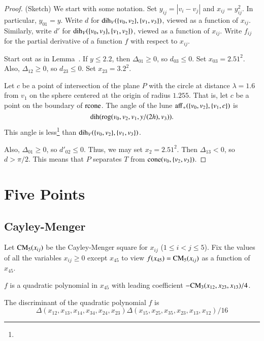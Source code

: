 \begin{proof} (Sketch)  We start with some notation.
Set $y_{ij}=|v_i-v_j|$ and $x_{ij} =y_{ij}^2$.  In particular, $y_{01}=y$.
Write $d$ for $\operatorname{dih}_V(\{v_0,v_2\},\{v_1,v_3\})$, viewed as a function
of $x_{ij}$.
Similarly, write $d'$ for $\operatorname{dih}_V(\{v_0,v_3\},\{v_1,v_2\})$, 
viewed as a function
of $x_{ij}$.
Write $f_{ij}$ for the
partial derivative of a function $f$ with respect to $x_{ij}$. 

Start out as in Lemma~.
If $y\le 2.2$, then $\Delta_{01}\ge0$, so
    $d_{03}\le 0$.
Set $x_{03}=2.51^2$. Also, $\Delta_{12}\ge0$, so
    $d_{23}\le0$.
Set $x_{23}=3.2^2$.

Let $c$ be a point of intersection of the plane $P$ with
the circle at distance $\lambda=1.6$ from $v_1$ on the sphere centered
at the origin of radius $1.255$.  That is, let $c$ be a point on the boundary
of ${\operatorname{rcone}}$.  The angle of the lune ${\operatorname{aff}}_+(\{v_0,v_2\},\{v_1,c\})$
is 
    $$\operatorname{dih}({\operatorname{rog}}(v_0,v_2,v_1,y/(2 h),v_3)).$$
This angle is less\footnote{} %
than $\operatorname{dih}_V(\{v_0,v_2\},\{v_1,v_3\})$. 

Also, $\Delta_{01}\ge0$, so $d'_{02}\le 0$.  Thus, we may
set $x_2=2.51^2$. Then
$\Delta_{13}<0$, so $d >\pi/2$.  This means that $P$
separates $T$ from ${\operatorname{cone}}(v_0,\{v_2,v_3\})$. 
\end{proof}
\newpage

\section{Five Points}

\subsection{Cayley-Menger}

Let ${\operatorname{CM}}_5(x_{ij})$ be the Cayley-Menger
square for $x_{ij}$  ($1\le i < j\le 5$).  Fix the values of all the variables $x_{ij}\ge 0$ except
$x_{45}$ to view $f(x_{45})={\operatorname{CM}}_5(x_{ij})$ as a function of $x_{45}$.

\begin{lemma}
$f$  is a quadratic
polynomial in $x_{45}$ with leading coefficient 
$-{\operatorname{CM}}_3(x_{12},x_{23},x_{13})/4$. 
\end{lemma}



\begin{lemma}
The discriminant of the quadratic polynomial $f$ is
	$$
	\Delta(x_{12}, x_{13}, x_{14}, x_{34}, x_{24}, x_{23}) 
	\Delta(x_{15}, x_{25}, x_{35}, x_{23}, 
          x_{13}, x_{12}) /16
	$$
\end{lemma}

